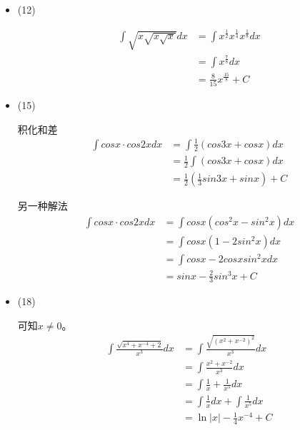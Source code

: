 \documentclass{article}
\begin{document}
\begin{itemize}
  \item (12)

        \begin{align*}
          \int \sqrt{x\sqrt{x\sqrt{x}}} dx
           & = \int x^{\frac{1}{2}} x^{\frac{1}{4}} x^{\frac{1}{8}} dx \\
           & = \int x^{\frac{7}{8}}  dx                                \\
           & = \frac{8}{15} x^{\frac{15}{8}} + C
        \end{align*}


  \item (15)

        积化和差
        \begin{align*}
          \int cos x \cdot cos 2x dx
           & = \int \frac{1}{2} (cos 3 x + cos x) dx         \\
           & = \frac{1}{2} \int (cos 3 x + cos x) dx         \\
           & = \frac{1}{2} (\frac{1}{3} sin 3 x + sin x) + C
        \end{align*}

        另一种解法
        \begin{align*}
          \int cos x \cdot cos 2x dx
           & = \int cos x (cos^2x - sin^2 x) dx \\
           & = \int cos x (1 - 2 sin^2 x) dx    \\
           & = \int cos x - 2 cos x sin^2 x dx  \\
           & = sinx - \frac{2}{3} sin^3 x + C
        \end{align*}

  \item (18)

        可知$x \neq 0$。
        \begin{align*}
          \int \frac{\sqrt{x^4 + x^{-4} + 2}}{x^3} dx
           & = \int \frac{\sqrt{(x^2 + x^{-2})^2}}{x^3} dx \\
           & = \int \frac{x^2 + x^{-2}}{x^3} dx            \\
           & = \int \frac{1}{x} + \frac{1}{x^5} dx         \\
           & = \int \frac{1}{x} dx + \int \frac{1}{x^5} dx \\
           & = \ln |x| - \frac{1}{4} x^{-4} + C
        \end{align*}

\end{itemize}
\end{document}

